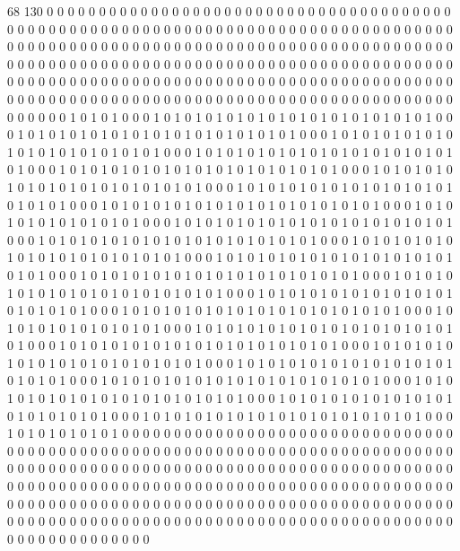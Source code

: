 68 130
0 0 0 0 0 0 0 0 0 0 0 0 0 0 0 0 0 0 0 0 0 0 0 0 0 0 0 0 0 0 0 0 0 0 0 0 0 0 0 0 0 0 0 0 0 0 0 0 0 0 0 0 0 0 0 0 0 0 0 0 0 0 0 0 0 0 0 0 0 0 0 0 0 0 0 0 0 0 0 0 0 0 0 0 0 0 0 0 0 0 0 0 0 0 0 0 0 0 0 0 0 0 0 0 0 0 0 0 0 0 0 0 0 0 0 0 0 0 0 0 0 0 0 0 0 0 0 0 0 0 0 0 0 0 0 0 0 0 0 0 0 0 0 0 0 0 0 0 0 0 0 0 0 0 0 0 0 0 0 0 0 0 0 0 0 0 0 0 0 0 0 0 0 0 0 0 0 0 0 0 0 0 0 0 0 0 0 0 0 0 0 0 0 0 0 0 0 0 0 0 0 0 0 0 0 0 0 0 0 0 0 0 0 0 0 0 0 0 0 0 0 0 0 0 0 0 0 0 0 0 0 0 0 0 0 0 0 0 0 0 0 0 0 0 0 0 0 0 0 0 0 0 0 0 0 0 0 0 0 0 
1 0 1 0 1 0 0 0 1 0 1 0 1 0 1 0 1 0 1 0 1 0 1 0 1 0 1 0 1 0 1 0 1 0 1 0 0 0 1 0 1 0 1 0 1 0 1 0 1 0 1 0 1 0 1 0 1 0 1 0 1 0 1 0 1 0 0 0 1 0 1 0 1 0 1 0 1 0 1 0 1 0 1 0 1 0 1 0 1 0 1 0 1 0 1 0 0 0 1 0 1 0 1 0 1 0 1 0 1 0 1 0 1 0 1 0 1 0 1 0 1 0 1 0 1 0 0 0 1 0 1 0 1 0 1 0 1 0 1 0 1 0 1 0 1 0 1 0 1 0 1 0 1 0 1 0 0 0 1 0 1 0 1 0 1 0 1 0 1 0 1 0 1 0 1 0 1 0 1 0 1 0 1 0 1 0 0 0 1 0 1 0 1 0 1 0 1 0 1 0 1 0 1 0 1 0 1 0 1 0 1 0 1 0 1 0 0 0 1 0 1 0 1 0 1 0 1 0 1 0 1 0 1 0 1 0 1 0 1 0 1 0 1 0 1 0 0 0 1 0 1 0 1 0 1 0 1 0 1 0 
1 0 1 0 1 0 0 0 1 0 1 0 1 0 1 0 1 0 1 0 1 0 1 0 1 0 1 0 1 0 1 0 1 0 1 0 0 0 1 0 1 0 1 0 1 0 1 0 1 0 1 0 1 0 1 0 1 0 1 0 1 0 1 0 1 0 0 0 1 0 1 0 1 0 1 0 1 0 1 0 1 0 1 0 1 0 1 0 1 0 1 0 1 0 1 0 0 0 1 0 1 0 1 0 1 0 1 0 1 0 1 0 1 0 1 0 1 0 1 0 1 0 1 0 1 0 0 0 1 0 1 0 1 0 1 0 1 0 1 0 1 0 1 0 1 0 1 0 1 0 1 0 1 0 1 0 0 0 1 0 1 0 1 0 1 0 1 0 1 0 1 0 1 0 1 0 1 0 1 0 1 0 1 0 1 0 0 0 1 0 1 0 1 0 1 0 1 0 1 0 1 0 1 0 1 0 1 0 1 0 1 0 1 0 1 0 0 0 1 0 1 0 1 0 1 0 1 0 1 0 1 0 1 0 1 0 1 0 1 0 1 0 1 0 1 0 0 0 1 0 1 0 1 0 1 0 1 0 1 0 
1 0 1 0 1 0 0 0 1 0 1 0 1 0 1 0 1 0 1 0 1 0 1 0 1 0 1 0 1 0 1 0 1 0 1 0 0 0 1 0 1 0 1 0 1 0 1 0 1 0 1 0 1 0 1 0 1 0 1 0 1 0 1 0 1 0 0 0 1 0 1 0 1 0 1 0 1 0 1 0 1 0 1 0 1 0 1 0 1 0 1 0 1 0 1 0 0 0 1 0 1 0 1 0 1 0 1 0 1 0 1 0 1 0 1 0 1 0 1 0 1 0 1 0 1 0 0 0 1 0 1 0 1 0 1 0 1 0 1 0 1 0 1 0 1 0 1 0 1 0 1 0 1 0 1 0 0 0 1 0 1 0 1 0 1 0 1 0 1 0 1 0 1 0 1 0 1 0 1 0 1 0 1 0 1 0 0 0 1 0 1 0 1 0 1 0 1 0 1 0 1 0 1 0 1 0 1 0 1 0 1 0 1 0 1 0 0 0 1 0 1 0 1 0 1 0 1 0 1 0 1 0 1 0 1 0 1 0 1 0 1 0 1 0 1 0 0 0 1 0 1 0 1 0 1 0 1 0 1 0 
0 0 0 0 0 0 0 0 0 0 0 0 0 0 0 0 0 0 0 0 0 0 0 0 0 0 0 0 0 0 0 0 0 0 0 0 0 0 0 0 0 0 0 0 0 0 0 0 0 0 0 0 0 0 0 0 0 0 0 0 0 0 0 0 0 0 0 0 0 0 0 0 0 0 0 0 0 0 0 0 0 0 0 0 0 0 0 0 0 0 0 0 0 0 0 0 0 0 0 0 0 0 0 0 0 0 0 0 0 0 0 0 0 0 0 0 0 0 0 0 0 0 0 0 0 0 0 0 0 0 0 0 0 0 0 0 0 0 0 0 0 0 0 0 0 0 0 0 0 0 0 0 0 0 0 0 0 0 0 0 0 0 0 0 0 0 0 0 0 0 0 0 0 0 0 0 0 0 0 0 0 0 0 0 0 0 0 0 0 0 0 0 0 0 0 0 0 0 0 0 0 0 0 0 0 0 0 0 0 0 0 0 0 0 0 0 0 0 0 0 0 0 0 0 0 0 0 0 0 0 0 0 0 0 0 0 0 0 0 0 0 0 0 0 0 0 0 0 0 0 0 0 0 0 0 0 0 0 0 0 
